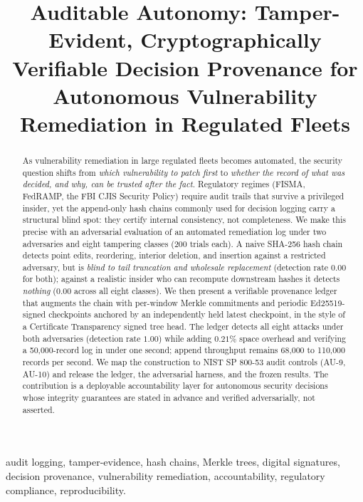 \documentclass[journal]{IEEEtran}
\title{Auditable Autonomy: Tamper-Evident, Cryptographically Verifiable
Decision Provenance for Autonomous Vulnerability Remediation in Regulated Fleets}
\author{%
  \IEEEauthorblockN{Harshavardhan Malla}
  \IEEEauthorblockA{Independent Researcher\\
  Email: harshavardhanmalla75@gmail.com}%
}
\begin{document}
\maketitle

\begin{abstract}
As vulnerability remediation in large regulated fleets becomes automated,
the security question shifts from \emph{which vulnerability to patch first}
to \emph{whether the record of what was decided, and why, can be trusted
after the fact}. Regulatory regimes (FISMA, FedRAMP, the FBI CJIS Security
Policy) require audit trails that survive a privileged insider, yet the
append-only hash chains commonly used for decision logging carry a
structural blind spot: they certify internal consistency, not completeness.
We make this precise with an adversarial evaluation of an automated
remediation log under two adversaries and eight tampering classes (200
trials each). A naive SHA-256 hash chain detects point edits, reordering,
interior deletion, and insertion against a restricted adversary, but is
\emph{blind to tail truncation and wholesale replacement} (detection rate
$0.00$ for both); against a realistic insider who can recompute downstream
hashes it detects \emph{nothing} ($0.00$ across all eight classes). We then
present a verifiable provenance ledger that augments the chain with
per-window Merkle commitments and periodic Ed25519-signed checkpoints
anchored by an independently held latest checkpoint, in the style of a
Certificate Transparency signed tree head. The ledger detects all eight
attacks under both adversaries (detection rate $1.00$) while adding
$0.21\%$ space overhead and verifying a 50{,}000-record log in under one
second; append throughput remains 68{,}000 to 110{,}000 records per second.
We map the construction to NIST SP 800-53 audit controls (AU-9, AU-10) and
release the ledger, the adversarial harness, and the frozen results. The
contribution is a deployable accountability layer for autonomous security
decisions whose integrity guarantees are stated in advance and verified
adversarially, not asserted.
\end{abstract}

\begin{IEEEkeywords}
audit logging, tamper-evidence, hash chains, Merkle trees, digital
signatures, decision provenance, vulnerability remediation, accountability,
regulatory compliance, reproducibility.
\end{IEEEkeywords}
\end{document}

